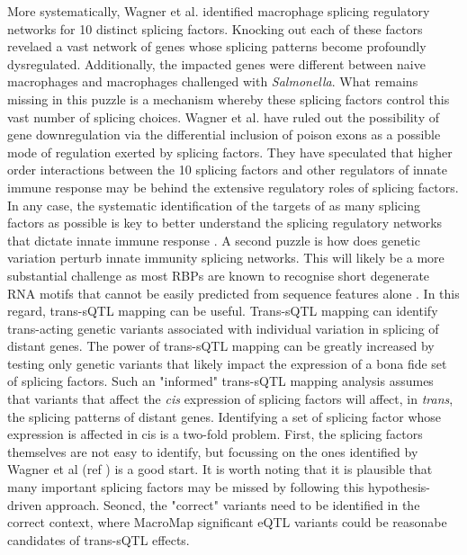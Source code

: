 More systematically, Wagner et al. \cite{Wagner2021-fl} identified macrophage splicing regulatory networks for 10 distinct splicing factors. Knocking out each of these factors revelaed a vast network of genes whose splicing patterns become profoundly dysregulated. Additionally, the impacted genes were different between naive macrophages and macrophages challenged with \textit{Salmonella}. What remains missing in this puzzle is a mechanism whereby these splicing factors control this vast number of splicing choices. Wagner et al. have ruled out the possibility of gene downregulation via the differential inclusion of poison exons as a possible mode of regulation exerted by splicing factors. They have speculated that higher order interactions between the 10 splicing factors and other regulators of innate immune response may be behind the extensive regulatory roles of splicing factors. In any case, the systematic identification of the targets of as many splicing factors as possible is key to better understand the splicing regulatory networks that dictate innate immune response \cite{Wagner2016-kl}. A second puzzle is how does genetic variation perturb innate immunity splicing networks. This will likely be a more substantial challenge as most RBPs are known to recognise short degenerate RNA motifs that cannot be easily predicted from sequence features alone \cite{Cereda2014-ty}. In this regard, trans-sQTL mapping can be useful. Trans-sQTL mapping can identify trans-acting genetic variants associated with individual variation in splicing of distant genes. The power of trans-sQTL mapping can be greatly increased by testing only genetic variants that likely impact the expression of a bona fide set of splicing factors. Such an "informed" trans-sQTL mapping analysis assumes that variants that affect the \textit{cis} expression of splicing factors will affect, in \textit{trans}, the splicing patterns of distant genes. Identifying a set of splicing factor whose expression is affected in cis is a two-fold problem. First, the splicing factors themselves are not easy to identify, but focussing on the ones identified by Wagner et al (ref \cite{Wagner2016-kl}) is a good start. It is worth noting that it is plausible that many important splicing factors may be missed by following this hypothesis-driven approach. Seoncd, the "correct" variants need to be identified in the correct context, where MacroMap significant eQTL variants could be reasonabe candidates of trans-sQTL effects. \\ 

